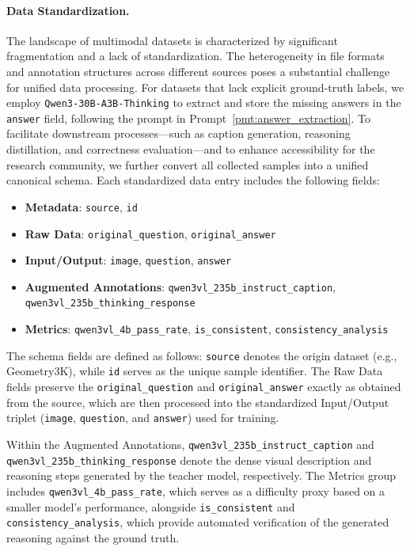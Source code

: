 \paragraph{Data Standardization.}
\label{sec:standardization}
The landscape of multimodal datasets is characterized by significant fragmentation and a lack of standardization. The heterogeneity in file formats and annotation structures across different sources poses a substantial challenge for unified data processing. For datasets that lack explicit ground-truth labels, we employ \texttt{Qwen3-30B-A3B-Thinking} to extract and store the missing answers in the \texttt{answer} field, following the prompt in Prompt~\ref{pmt:answer_extraction}. To facilitate downstream processes—such as caption generation, reasoning distillation, and correctness evaluation—and to enhance accessibility for the research community, we further convert all collected samples into a unified canonical schema. Each standardized data entry includes the following fields:
\begin{itemize}
    \item \textbf{Metadata}: \texttt{source}, \texttt{id}
    \item \textbf{Raw Data}: \texttt{original\_question}, \texttt{original\_answer}
    \item \textbf{Input/Output}: \texttt{image}, \texttt{question}, \texttt{answer}
    \item \textbf{Augmented Annotations}: \texttt{qwen3vl\_235b\_instruct\_caption}, \texttt{qwen3vl\_235b\_thinking\_response}
    \item \textbf{Metrics}: \texttt{qwen3vl\_4b\_pass\_rate}, \texttt{is\_consistent}, \texttt{consistency\_analysis}
\end{itemize}
\noindent
The schema fields are defined as follows: \texttt{source} denotes the origin dataset (e.g., Geometry3K), while \texttt{id} serves as the unique sample identifier. The Raw Data fields preserve the \texttt{original\_question} and \texttt{original\_answer} exactly as obtained from the source, which are then processed into the standardized Input/Output triplet (\texttt{image}, \texttt{question}, and \texttt{answer}) used for training.

Within the Augmented Annotations, \texttt{qwen3vl\_235b\_instruct\_caption} and \texttt{qwen3vl\_235b\_thinking\_response} denote the dense visual description and reasoning steps generated by the teacher model, respectively. The Metrics group includes \texttt{qwen3vl\_4b\_pass\_rate}, which serves as a difficulty proxy based on a smaller model's performance, alongside \texttt{is\_consistent} and \texttt{consistency\_analysis}, which provide automated verification of the generated reasoning against the ground truth.


